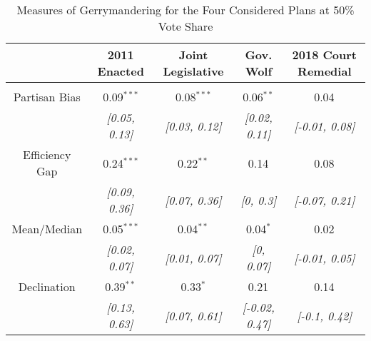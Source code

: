 

\begin{table}[!htbp] \centering 
  \caption{Measures of Gerrymandering for the Four Considered Plans at 50\% Vote Share} 
  \label{tab:gerry} 
\begin{tabular}{@{\extracolsep{-5pt}} ccccc} 
 & 2011 Enacted & Joint Legislative & Gov. Wolf & 2018 Court Remedial \\ 
\hline \\[-1.8ex] 
Partisan Bias & 0.09$^{***}$ & 0.08$^{***}$ & 0.06$^{**}$ & 0.04$^{}$ \\ 
 & {\small\textit{[0.05, 0.13]}} & {\small\textit{[0.03, 0.12]}} & {\small\textit{[0.02, 0.11]}} & {\small\textit{[-0.01, 0.08]}} \\ 
Efficiency Gap & 0.24$^{***}$ & 0.22$^{**}$ & 0.14$^{}$ & 0.08$^{}$ \\ 
 & {\small\textit{[0.09, 0.36]}} & {\small\textit{[0.07, 0.36]}} & {\small\textit{[0, 0.3]}} & {\small\textit{[-0.07, 0.21]}} \\ 
Mean/Median & 0.05$^{***}$ & 0.04$^{**}$ & 0.04$^{*}$ & 0.02$^{}$ \\ 
 & {\small\textit{[0.02, 0.07]}} & {\small\textit{[0.01, 0.07]}} & {\small\textit{[0, 0.07]}} & {\small\textit{[-0.01, 0.05]}} \\ 
Declination & 0.39$^{**}$ & 0.33$^{*}$ & 0.21$^{}$ & 0.14$^{}$ \\ 
 & {\small\textit{[0.13, 0.63]}} & {\small\textit{[0.07, 0.61]}} & {\small\textit{[-0.02, 0.47]}} & {\small\textit{[-0.1, 0.42]}} \\ 
\end{tabular}
\end{table}
 
 

